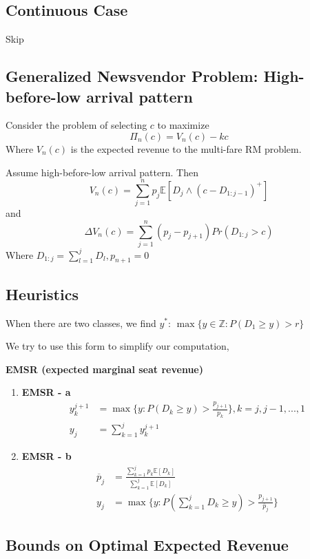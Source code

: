 \documentclass[11pt,a4paper]{article}
\begin{document}
\subsection{Continuous Case}
Skip

\subsection{ Generalized Newsvendor Problem: High-before-low arrival pattern}
Consider the problem of selecting $c$ to maximize $$\Pi_n(c)=V_n(c)-kc$$
Where $V_n(c)$ is the expected revenue to the multi-fare RM problem.

Assume high-before-low arrival pattern. Then
$$V_n(c)=\sum_{j=1}^n p_j \mathbb{E}[D_j\wedge (c-D_{1:j-1})^+]$$
and $$\Delta V_n(c)=\sum_{j=1}^n(p_j-p_{j+1})Pr(D_{1:j}>c)$$
Where $D_{1:j}=\sum_{l=1}^j D_l, p_{n+1}=0$

\subsection{Heuristics}
When there are two classes, we find $y^*$: $\max\{y\in \mathbb{Z}: P(D_1\geq y)>r\}$

We try to use this form to simplify our computation,

\textbf{EMSR (expected marginal seat revenue)}
\begin{enumerate}[$\bullet$]
    \item \textbf{EMSR - a}
    \begin{equation}
        \begin{aligned}
            y_k^{j+1}&=\max\{y:P(D_k\geq y)>\frac{p_{j+1}}{p_k}\}, k=j,j-1,...,1\\
            y_j&=\sum_{k=1}^jy_k^{j+1}
        \end{aligned}
        \nonumber
    \end{equation}
    \item \textbf{EMSR - b}
    \begin{equation}
        \begin{aligned}
            \overline{p}_j&=\frac{\sum_{k=1}^jp_k \mathbb{E} [D_k]}{\sum_{k=1}^j \mathbb{E} [D_k]}\\
            y_j&=\max\{y:P(\sum_{k=1}^j D_k\geq y)>\frac{p_{j+1}}{\overline{p}_j}\}
        \end{aligned}
        \nonumber
    \end{equation}
\end{enumerate}

\subsection{ Bounds on Optimal Expected Revenue}
\end{document}
